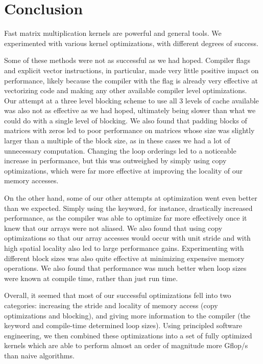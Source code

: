 \section{Conclusion}\label{sec:conc}

Fast matrix multiplication kernels are powerful and general tools.
We experimented with various kernel optimizations, with different degrees of success.

Some of these methods were not as successful as we had hoped. 
Compiler flags and explicit vector instructions, in particular, made very little positive impact on performance, 
likely because the  compiler with the  flag is already very effective at vectorizing code 
and making any other available compiler level optimizations. 
Our attempt at a three level blocking scheme to use all 3 levels of cache available was also not as effective as we had hoped, 
ultimately being slower than what we could do with a single level of blocking.
We also found that padding blocks of matrices with zeros led to poor performance on matrices whose size was slightly larger than a multiple of the block size, as in these cases we had a lot of unnecessary computation.
Changing the loop orderings led to a noticeable increase in performance, but this was outweighed by simply using copy optimizations, which were far more effective at improving the locality of our memory accesses.

On the other hand, some of our other attempts at optimization went even better than we expected. 
Simply using the  keyword, for instance, drastically increased performance, 
as the compiler was able to optimize far more effectively once it knew that our arrays were not aliased. 
We also found that using copy optimizations so that our array accesses would occur with unit stride and with high spatial locality also led to large performance gains.
Experimenting with different block sizes was also quite effective at minimizing expensive memory operations.
We also found that performance was much better when loop sizes were known at compile time, rather than just run time. 

Overall, it seemed that most of our successful optimizations fell into two categories: increasing the stride and locality of memory access (copy optimizations and blocking), and giving more information to the compiler (the  keyword and compile-time determined loop sizes). Using principled
software engineering, we then combined these optimizations into a set of fully
optimized kernels which are able to perform almost an order of magnitude more
Gflop/s than naive algorithms.
